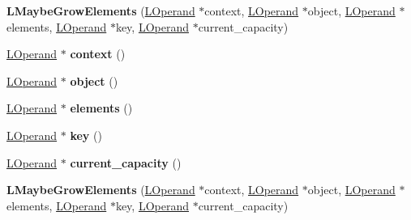 \begin{DoxyCompactItemize}
\item 
{\bfseries L\+Maybe\+Grow\+Elements} (\hyperlink{classv8_1_1internal_1_1_l_operand}{L\+Operand} $\ast$context, \hyperlink{classv8_1_1internal_1_1_l_operand}{L\+Operand} $\ast$object, \hyperlink{classv8_1_1internal_1_1_l_operand}{L\+Operand} $\ast$elements, \hyperlink{classv8_1_1internal_1_1_l_operand}{L\+Operand} $\ast$key, \hyperlink{classv8_1_1internal_1_1_l_operand}{L\+Operand} $\ast$current\+\_\+capacity)\hypertarget{classv8_1_1internal_1_1_l_maybe_grow_elements_aae48ee99b99d58f8e16bc264666c78ff}{}\label{classv8_1_1internal_1_1_l_maybe_grow_elements_aae48ee99b99d58f8e16bc264666c78ff}

\item 
\hyperlink{classv8_1_1internal_1_1_l_operand}{L\+Operand} $\ast$ {\bfseries context} ()\hypertarget{classv8_1_1internal_1_1_l_maybe_grow_elements_a6af5b70c66f542bb308ac9ada8cb6372}{}\label{classv8_1_1internal_1_1_l_maybe_grow_elements_a6af5b70c66f542bb308ac9ada8cb6372}

\item 
\hyperlink{classv8_1_1internal_1_1_l_operand}{L\+Operand} $\ast$ {\bfseries object} ()\hypertarget{classv8_1_1internal_1_1_l_maybe_grow_elements_a557ff494aa6f7b9a2a5f218005419b34}{}\label{classv8_1_1internal_1_1_l_maybe_grow_elements_a557ff494aa6f7b9a2a5f218005419b34}

\item 
\hyperlink{classv8_1_1internal_1_1_l_operand}{L\+Operand} $\ast$ {\bfseries elements} ()\hypertarget{classv8_1_1internal_1_1_l_maybe_grow_elements_aa58e07c5ac443be8021a0a6dbfe237cb}{}\label{classv8_1_1internal_1_1_l_maybe_grow_elements_aa58e07c5ac443be8021a0a6dbfe237cb}

\item 
\hyperlink{classv8_1_1internal_1_1_l_operand}{L\+Operand} $\ast$ {\bfseries key} ()\hypertarget{classv8_1_1internal_1_1_l_maybe_grow_elements_ac0b59ca4db13f2a31428c9b8063321dc}{}\label{classv8_1_1internal_1_1_l_maybe_grow_elements_ac0b59ca4db13f2a31428c9b8063321dc}

\item 
\hyperlink{classv8_1_1internal_1_1_l_operand}{L\+Operand} $\ast$ {\bfseries current\+\_\+capacity} ()\hypertarget{classv8_1_1internal_1_1_l_maybe_grow_elements_a8fc52ebb7ecf6d10f977d9b56cfe702d}{}\label{classv8_1_1internal_1_1_l_maybe_grow_elements_a8fc52ebb7ecf6d10f977d9b56cfe702d}

\item 
{\bfseries L\+Maybe\+Grow\+Elements} (\hyperlink{classv8_1_1internal_1_1_l_operand}{L\+Operand} $\ast$context, \hyperlink{classv8_1_1internal_1_1_l_operand}{L\+Operand} $\ast$object, \hyperlink{classv8_1_1internal_1_1_l_operand}{L\+Operand} $\ast$elements, \hyperlink{classv8_1_1internal_1_1_l_operand}{L\+Operand} $\ast$key, \hyperlink{classv8_1_1internal_1_1_l_operand}{L\+Operand} $\ast$current\+\_\+capacity)\hypertarget{classv8_1_1internal_1_1_l_maybe_grow_elements_aae48ee99b99d58f8e16bc264666c78ff}{}\label{classv8_1_1internal_1_1_l_maybe_grow_elements_aae48ee99b99d58f8e16bc264666c78ff}


\end{DoxyCompactItemize}
